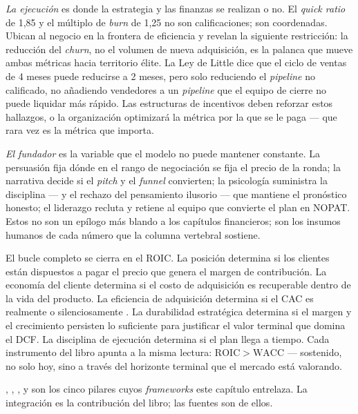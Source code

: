 \emph{La ejecución} es donde la estrategia y las finanzas se realizan o no. El \emph{quick ratio}
de 1,85 y el múltiplo de \emph{burn} de 1,25 no son calificaciones; son coordenadas. Ubican al
negocio en la frontera de eficiencia y revelan la siguiente restricción: la reducción del
\emph{churn}, no el volumen de nueva adquisición, es la palanca que mueve ambas métricas hacia
territorio élite. La Ley de Little dice que el ciclo de ventas de 4 meses puede reducirse a 2
meses, pero solo reduciendo el \emph{pipeline} no calificado, no añadiendo vendedores a un
\emph{pipeline} que el equipo de cierre no puede liquidar más rápido. Las estructuras de
incentivos deben reforzar estos hallazgos, o la organización optimizará la métrica por la que
se le paga --- que rara vez es la métrica que importa.

\emph{El fundador} es la variable que el modelo no puede mantener constante. La persuasión fija
dónde en el rango de negociación se fija el precio de la ronda; la narrativa decide si el
\emph{pitch} y el \emph{funnel} convierten; la psicología suministra la disciplina --- y el
rechazo del pensamiento ilusorio --- que mantiene el pronóstico honesto; el liderazgo recluta y
retiene al equipo que convierte el plan en NOPAT. Estos no son un epílogo más blando a los
capítulos financieros; son los insumos humanos de cada número que la columna vertebral sostiene.

El bucle completo se cierra en el ROIC. La posición determina si los clientes están dispuestos
a pagar el precio que genera el margen de contribución. La economía del cliente determina si el
costo de adquisición es recuperable dentro de la vida del producto. La eficiencia de adquisición
determina si el CAC es realmente  o silenciosamente . La durabilidad
estratégica determina si el margen y el crecimiento persisten lo suficiente para justificar el
valor terminal que domina el DCF. La disciplina de ejecución determina si el plan llega a tiempo.
Cada instrumento del libro apunta a la misma lectura: \(\mathrm{ROIC}>\mathrm{WACC}\) ---
sostenido, no solo hoy, sino a través del horizonte terminal que el mercado está valorando.

\textcite{brealey2020}, \textcite{damodaran2012}, \textcite{gupta2004customer},
\textcite{porter1985} y \textcite{osterwalder2010} son los cinco pilares cuyos \emph{frameworks}
este capítulo entrelaza. La integración es la contribución del libro; las fuentes son de ellos.
